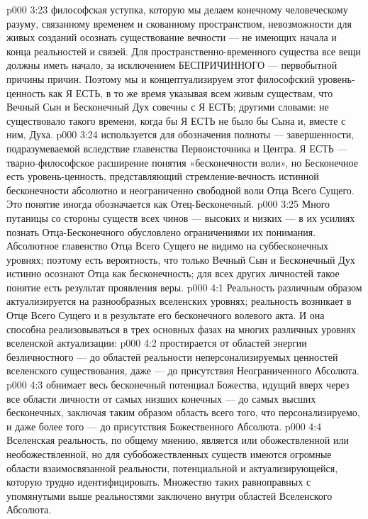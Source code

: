 \vs p000 3:23 \pc {} философская уступка, которую мы делаем конечному человеческому разуму, связанному временем и скованному пространством, невозможности для живых созданий осознать существование вечности --- не имеющих начала и конца реальностей и связей. Для пространственно\hyp{}временного существа все вещи должны иметь начало, за исключением БЕСПРИЧИННОГО --- первобытной причины причин. Поэтому мы и концептуализируем этот философский уровень\hyp{}ценность как Я ЕСТЬ, в то же время указывая всем живым существам, что Вечный Сын и Бесконечный Дух совечны с Я ЕСТЬ; другими словами: не существовало такого времени, когда бы Я ЕСТЬ не было бы  Сына и, вместе с ним, Духа.
\vs p000 3:24 \pc {} используется для обозначения полноты --- завершенности, подразумеваемой вследствие главенства Первоисточника и Центра.  Я ЕСТЬ --- тварно\hyp{}философское расширение понятия «бесконечности воли», но Бесконечное есть  уровень\hyp{}ценность, представляющий стремление\hyp{}вечность истинной бесконечности абсолютно и неограниченно свободной воли Отца Всего Сущего. Это понятие иногда обозначается как Отец\hyp{}Бесконечный.
\vs p000 3:25 Много путаницы со стороны существ всех чинов --- высоких и низких --- в их усилиях познать Отца\hyp{}Бесконечного обусловлено ограничениями их понимания. Абсолютное главенство Отца Всего Сущего не видимо на суббесконечных уровнях; поэтому есть вероятность, что только Вечный Сын и Бесконечный Дух истинно осознают Отца как бесконечность; для всех других личностей такое понятие есть результат проявления веры.
\vs p000 4:1 Реальность различным образом актуализируется на разнообразных вселенских уровнях; реальность возникает в Отце Всего Сущего и в результате его бесконечного волевого акта. И она способна реализовываться в трех основных фазах на многих различных уровнях вселенской актуализации:
\vs p000 4:2 \bibnobreakspace {} простирается от областей энергии безличностного --- до областей реальности неперсонализируемых ценностей вселенского существования, даже --- до присутствия Неограниченного Абсолюта.
\vs p000 4:3 \bibnobreakspace {} обнимает весь бесконечный потенциал Божества, идущий вверх через все области личности от самых низших конечных --- до самых высших бесконечных, заключая таким образом область всего того, что персонализируемо, и даже более того --- до присутствия Божественного Абсолюта.
\vs p000 4:4 \bibnobreakspace {} Вселенская реальность, по общему мнению, является или обожествленной или необожествленной, но для субобожествленных существ имеются огромные области взаимосвязанной реальности, потенциальной и актуализирующейся, которую трудно идентифицировать. Множество таких равноправных с упомянутыми выше реальностями заключено внутри областей Вселенского Абсолюта.
